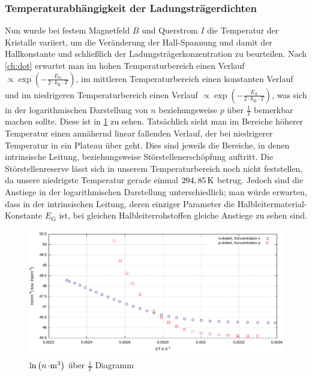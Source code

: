 \documentclass[numbers=noenddot,14pt,a4paper]{scrartcl}
\newcommand{\ix}[1]{_\text{#1}}
\begin{document}
\subsubsection{Temperaturabhängigkeit der Ladungsträgerdichten}
Nun wurde bei festem Magnetfeld $B$ und Querstrom $I$ die Temperatur der Kristalle variiert, um die Veränderung der Hall-Spannung und damit der Hallkonstante und schließlich der Ladungsträgerkonzentration zu beurteilen. Nach \ref{ch:dot} erwartet man im hohen Temperaturbereich einen Verlauf $\propto \exp\left(-\frac{E\ix{G}}{2\cdot k\ix{B}\cdot T} \right)$, im mittleren Temperaturbereich einen konstanten Verlauf und im niedrigeren Temperaturbereich einen Verlauf $\propto \exp\left(-\frac{E\ix{d}}{2\cdot k\ix{B}\cdot T} \right)$, was sich in der logarithmischen Darstellung von $n$ beziehungsweise $p$ über $\frac{1}{T}$ bemerkbar machen sollte. Diese ist in \ref{img:dotierttemperatur} zu sehen. Tatsächlich sieht man im Bereiche höherer Temperatur einen annähernd linear fallenden Verlauf, der bei niedrigerer Temperatur in ein Plateau über geht. Dies sind jeweils die Bereiche, in denen intrinsische Leitung, beziehungsweise Störstellenerschöpfung auftritt. Die Störstellenreserve lässt sich in unserem Temperaturbereich noch nicht feststellen, da unsere niedrigste Temperatur gerade einmal $\unit[294,85]{K}$ betrug. Jedoch sind die Anstiege in der logarithmischen Darstellung unterschiedlich; man würde erwarten, dass in der intrinsischen Leitung, deren einziger Parameter die Halbleitermaterial-Konstante $E\ix{G}$ ist, bei gleichen Halbleiterrohstoffen gleiche Anstiege zu sehen sind.
\begin{figure}[H]
	\includegraphics[width=\textwidth]{messwerte/temperaturkonzentration.pdf}
	\caption{$\ln\left(\unit[n]{\cdot m^3}\right)$ über $\frac{1}{T}$ Diagramm} \label{img:dotierttemperatur}
\end{figure}
\end{document}
